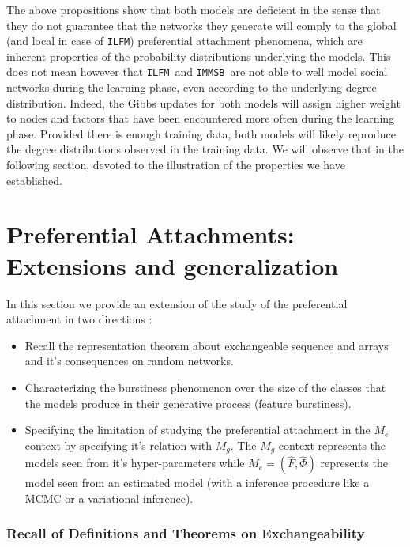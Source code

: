 \documentclass{llncs}
\newcommand{\ifm}{\texttt{ILFM}}
\newcommand{\imb}{\texttt{IMMSB}}
\begin{document}
The above propositions show that both models are deficient in the sense that they do not guarantee that the networks they generate will comply to the global (and local in case of \ifm) preferential attachment phenomena, which are inherent properties of the probability distributions underlying the models. This does not mean however that \ifm\ and \imb\ are not able to well model social networks during the learning phase, even according to the underlying degree distribution. Indeed, the Gibbs updates for both models will assign higher weight to nodes and factors that have been encountered more often during the learning phase. Provided there is enough training data, both models will likely reproduce the degree distributions observed in the training data. We will observe that in the following section, devoted to the illustration of the properties we have established.


\section{Preferential Attachments: Extensions and generalization}
In this section we provide an extension of the study of the preferential attachment in two directions :
\begin{itemize}
    \item Recall the representation theorem \cite{orbanz2015bayesian} about exchangeable sequence and arrays and it's consequences on random networks.%
    \item Characterizing the burstiness phenomenon over the size of the classes that the models produce in their generative process (feature burstiness). 
    \item Specifying the limitation of studying the preferential attachment in the $M_e$ context by specifying it's relation with $M_g$. The $M_g$ context represents the models seen from it's hyper-parameters while $M_e = (\hat F, \hat \Phi)$ represents the model seen from an estimated model (with a inference procedure like a MCMC or a variational inference).
\end{itemize}

\subsubsection{Recall of Definitions and Theorems on Exchangeability}~\\
\end{document}

